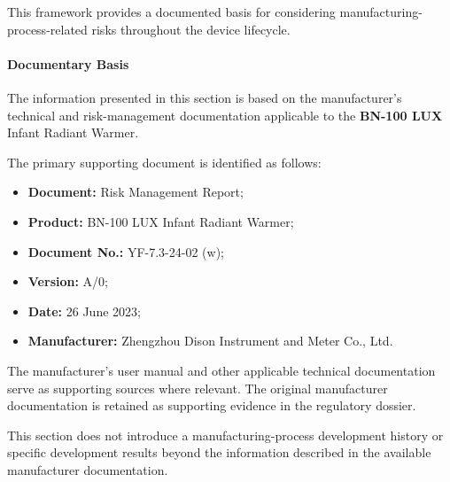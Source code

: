 This framework provides a documented basis for considering
manufacturing-process-related risks throughout the device lifecycle.

\paragraph{Documentary Basis}

The information presented in this section is based on the
manufacturer's technical and risk-management documentation
applicable to the \textbf{BN-100 LUX} Infant Radiant Warmer.

The primary supporting document is identified as follows:

\begin{itemize}
    \item \textbf{Document:} Risk Management Report;
    \item \textbf{Product:} BN-100 LUX Infant Radiant Warmer;
    \item \textbf{Document No.:} YF-7.3-24-02 (w);
    \item \textbf{Version:} A/0;
    \item \textbf{Date:} 26 June 2023;
    \item \textbf{Manufacturer:} Zhengzhou Dison Instrument and Meter
    Co., Ltd.
\end{itemize}

The manufacturer's user manual and other applicable technical
documentation serve as supporting sources where relevant. The
original manufacturer documentation is retained as supporting
evidence in the regulatory dossier.

This section does not introduce a manufacturing-process development
history or specific development results beyond the information
described in the available manufacturer documentation.

